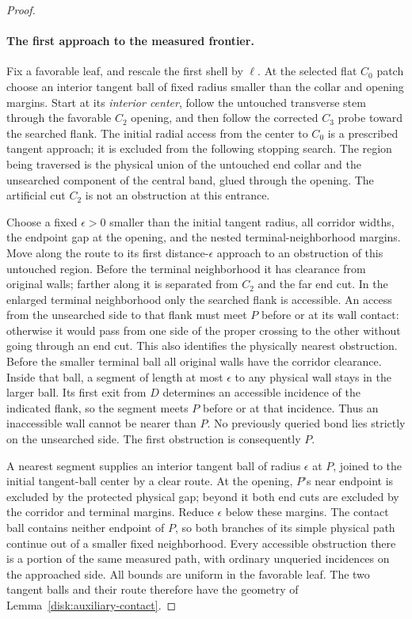 \begin{proof}
\paragraph{The first approach to the measured frontier.}
Fix a favorable leaf, and rescale the first shell by $\ell$.  At the
selected flat $C_0$ patch choose an interior tangent ball of fixed
radius smaller than the collar and opening margins.  Start at its
\emph{interior center}, follow the untouched transverse stem through
the favorable $C_2$ opening, and then follow the corrected $C_3$ probe
toward the searched flank.  The initial radial access from the center
to $C_0$ is a prescribed tangent approach; it is excluded from the
following stopping search.  The region being traversed is the physical
union of the untouched end collar and the unsearched component of the
central band, glued through the opening.  The artificial cut $C_2$ is
not an obstruction at this entrance.

Choose a fixed $\epsilon>0$ smaller than the initial tangent radius,
all corridor widths, the endpoint gap at the opening, and the nested
terminal-neighborhood margins.  Move along the route to its first
distance-$\epsilon$ approach to an obstruction of this untouched
region.  Before the terminal neighborhood it has clearance from
original walls; farther along it is separated from $C_2$ and the far
end cut.  In the enlarged terminal neighborhood only the searched
flank is accessible.  An access from the unsearched side to that flank
must meet $P$ before or at its wall contact: otherwise it would pass
from one side of the proper crossing to the other without going through
an end cut.  This also identifies the physically nearest obstruction.
Before the smaller terminal ball all original walls have the corridor
clearance.  Inside that ball, a segment of length at most $\epsilon$
to any physical wall stays in the larger ball.  Its first exit from
$D$ determines an accessible incidence of the indicated flank, so the
segment meets $P$ before or at that incidence.  Thus an inaccessible
wall cannot be nearer than $P$.  No previously queried bond lies
strictly on the unsearched side.  The first obstruction is consequently
$P$.

A nearest segment supplies an interior tangent ball of radius
$\epsilon$ at $P$, joined to the initial tangent-ball center by a clear
route.  At the opening, $P$'s near endpoint is excluded by the protected
physical gap; beyond it both end cuts are excluded by the corridor
and terminal margins.  Reduce $\epsilon$ below these margins.  The
contact ball contains neither endpoint of $P$, so both branches of
its simple physical path continue out of a smaller fixed neighborhood.
Every accessible obstruction there is a portion of the same measured
path, with ordinary unqueried incidences on the approached side.
All bounds are uniform in the favorable leaf.  The two tangent balls
and their route therefore have the geometry of
Lemma~\ref{disk:auxiliary-contact}.


\end{proof}
